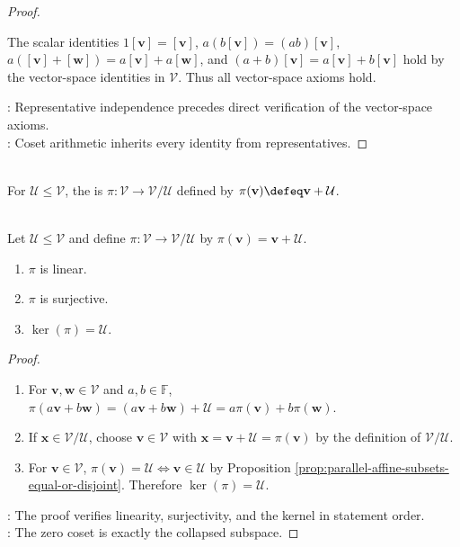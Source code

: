 \begin{proposition}
\begin{proof}
\begin{enumerate}[label=(\roman*)]
The scalar identities $1[\mathbf{v}]=[\mathbf{v}]$, $a(b[\mathbf{v}])=(ab)[\mathbf{v}]$, $a([\mathbf{v}]+[\mathbf{w}])=a[\mathbf{v}]+a[\mathbf{w}]$, and $(a+b)[\mathbf{v}]=a[\mathbf{v}]+b[\mathbf{v}]$ hold by the vector-space identities in $\mathcal{V}$. Thus all vector-space axioms hold.
\end{enumerate}
: Representative independence precedes direct verification of the vector-space axioms.\\
: Coset arithmetic inherits every identity from representatives.
\end{proof}
\end{proposition}

\begin{definition} \label{def:quotient-map} \\
For $\mathcal{U}\leq\mathcal{V}$, the  is $\pi:\mathcal{V}\to\mathcal{V}/\mathcal{U}$ defined by $\pi(\mathbf{v})\defeq\mathbf{v}+\mathcal{U}$.
\end{definition}

\begin{proposition} \label{prop:quotient-map-properties} \\
Let $\mathcal{U}\leq\mathcal{V}$ and define $\pi:\mathcal{V}\to\mathcal{V}/\mathcal{U}$ by $\pi(\mathbf{v})=\mathbf{v}+\mathcal{U}$.
\begin{enumerate}[label=(\roman*)]
\setlength{\itemsep}{0pt}
\item $\pi$ is linear.
\item $\pi$ is surjective.
\item $\ker(\pi)=\mathcal{U}$.
\end{enumerate}
\begin{proof}
\begin{enumerate}[label=(\roman*)]
\setlength{\itemsep}{0pt}
\item For $\mathbf{v},\mathbf{w}\in\mathcal{V}$ and $a,b\in\mathbb{F}$, $\pi(a\mathbf{v}+b\mathbf{w})=(a\mathbf{v}+b\mathbf{w})+\mathcal{U}=a\pi(\mathbf{v})+b\pi(\mathbf{w})$.
\item If $\mathbf{x}\in\mathcal{V}/\mathcal{U}$, choose $\mathbf{v}\in\mathcal{V}$ with $\mathbf{x}=\mathbf{v}+\mathcal{U}=\pi(\mathbf{v})$ by the definition of $\mathcal{V}/\mathcal{U}$.
\item For $\mathbf{v}\in\mathcal{V}$, $\pi(\mathbf{v})=\mathcal{U}\Longleftrightarrow\mathbf{v}\in\mathcal{U}$ by Proposition \ref{prop:parallel-affine-subsets-equal-or-disjoint}. Therefore $\ker(\pi)=\mathcal{U}$.
\end{enumerate}
: The proof verifies linearity, surjectivity, and the kernel in statement order.\\
: The zero coset is exactly the collapsed subspace.
\end{proof}
\end{proposition}

